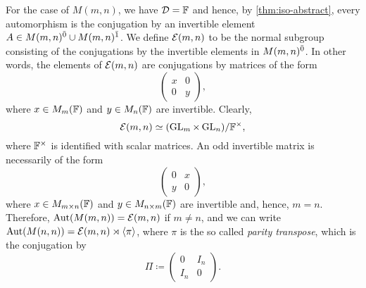For the case of $M(m,n)$, we have $\mathcal{D} = \mathbb{F}$ and hence, by \cref{thm:iso-abstract}, every automorphism is the conjugation by an invertible element $A \in M(m,n)^{\bar0} \cup M(m,n)^{\bar1}$. 
We define $\mathcal E (m,n)$ to be the normal subgroup consisting of the conjugations by the invertible elements in $M(m,n)^{\bar0}$. 
In other words, the elements of $\mathcal E (m,n)$ are conjugations by matrices of the form
\[\label{eq:mc-E(m-n)-is-conjugation}
\begin{pmatrix}
    x & 0\\
    0 & y
\end{pmatrix},
\]
where $x \in M_{m}(\mathbb{F})$ and $y\in M_n(\mathbb{F})$ are invertible. 
Clearly, \[
    \mathcal E(m,n) \simeq (\operatorname{GL}_m \times \operatorname{GL}_n) / \mathbb{F}^\times,
\]
where $\mathbb{F}^\times$ is identified with scalar matrices.
An odd invertible matrix is necessarily of the form 
\[
\begin{pmatrix}
    0 & x\\
    y & 0
\end{pmatrix},
\]
where $x \in M_{m\times n} (\mathbb{F})$ and $y \in M_{n\times m} (\mathbb{F})$ are invertible and, hence, $m = n$. 
Therefore, $\operatorname{Aut}( M(m,n)) = \mathcal E (m,n)$ if $m \neq n$, and we can write $\operatorname{Aut}(M(n,n)) = \mathcal E (m,n) \rtimes \langle \pi \rangle$, where $\pi$ is the so called \emph{parity transpose}, which is the conjugation by 
\[\label{eq:pi-is-conjugation-by}
    \Pi \coloneqq \begin{pmatrix}
    0 & I_n\\
    I_n & 0
\end{pmatrix}.
\]

